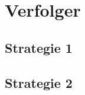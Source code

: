 %
%
%
\section{Verfolger
\label{lambertw:section:Verfolger}}



\subsection{Strategie 1
\label{lambertw:subsection:Strategie1}}


\subsection{Strategie 2
\label{lambertw:subsection:Strategie2}}

